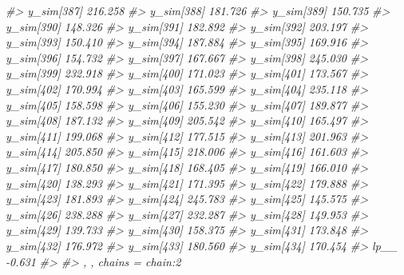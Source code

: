 \documentclass[
  10pt,
  italian,
  a4paper,
  extrafontsizes,onecolumn,openright
  ]{memoir}
\newenvironment{Shaded}{\begin{snugshade}}{\end{snugshade}}
\newcommand{\CommentTok}[1]{\textcolor[rgb]{0.56,0.35,0.01}{\textit{#1}}}
\begin{document}
\begin{Shaded}
\begin{Highlighting}[]
\CommentTok{\#\textgreater{}   y\_sim[387] 216.258}
\CommentTok{\#\textgreater{}   y\_sim[388] 181.726}
\CommentTok{\#\textgreater{}   y\_sim[389] 150.735}
\CommentTok{\#\textgreater{}   y\_sim[390] 148.326}
\CommentTok{\#\textgreater{}   y\_sim[391] 182.892}
\CommentTok{\#\textgreater{}   y\_sim[392] 203.197}
\CommentTok{\#\textgreater{}   y\_sim[393] 150.410}
\CommentTok{\#\textgreater{}   y\_sim[394] 187.884}
\CommentTok{\#\textgreater{}   y\_sim[395] 169.916}
\CommentTok{\#\textgreater{}   y\_sim[396] 154.732}
\CommentTok{\#\textgreater{}   y\_sim[397] 167.667}
\CommentTok{\#\textgreater{}   y\_sim[398] 245.030}
\CommentTok{\#\textgreater{}   y\_sim[399] 232.918}
\CommentTok{\#\textgreater{}   y\_sim[400] 171.023}
\CommentTok{\#\textgreater{}   y\_sim[401] 173.567}
\CommentTok{\#\textgreater{}   y\_sim[402] 170.994}
\CommentTok{\#\textgreater{}   y\_sim[403] 165.599}
\CommentTok{\#\textgreater{}   y\_sim[404] 235.118}
\CommentTok{\#\textgreater{}   y\_sim[405] 158.598}
\CommentTok{\#\textgreater{}   y\_sim[406] 155.230}
\CommentTok{\#\textgreater{}   y\_sim[407] 189.877}
\CommentTok{\#\textgreater{}   y\_sim[408] 187.132}
\CommentTok{\#\textgreater{}   y\_sim[409] 205.542}
\CommentTok{\#\textgreater{}   y\_sim[410] 165.497}
\CommentTok{\#\textgreater{}   y\_sim[411] 199.068}
\CommentTok{\#\textgreater{}   y\_sim[412] 177.515}
\CommentTok{\#\textgreater{}   y\_sim[413] 201.963}
\CommentTok{\#\textgreater{}   y\_sim[414] 205.850}
\CommentTok{\#\textgreater{}   y\_sim[415] 218.006}
\CommentTok{\#\textgreater{}   y\_sim[416] 161.603}
\CommentTok{\#\textgreater{}   y\_sim[417] 180.850}
\CommentTok{\#\textgreater{}   y\_sim[418] 168.405}
\CommentTok{\#\textgreater{}   y\_sim[419] 166.010}
\CommentTok{\#\textgreater{}   y\_sim[420] 138.293}
\CommentTok{\#\textgreater{}   y\_sim[421] 171.395}
\CommentTok{\#\textgreater{}   y\_sim[422] 179.888}
\CommentTok{\#\textgreater{}   y\_sim[423] 181.893}
\CommentTok{\#\textgreater{}   y\_sim[424] 245.783}
\CommentTok{\#\textgreater{}   y\_sim[425] 145.575}
\CommentTok{\#\textgreater{}   y\_sim[426] 238.288}
\CommentTok{\#\textgreater{}   y\_sim[427] 232.287}
\CommentTok{\#\textgreater{}   y\_sim[428] 149.953}
\CommentTok{\#\textgreater{}   y\_sim[429] 139.733}
\CommentTok{\#\textgreater{}   y\_sim[430] 158.375}
\CommentTok{\#\textgreater{}   y\_sim[431] 173.848}
\CommentTok{\#\textgreater{}   y\_sim[432] 176.972}
\CommentTok{\#\textgreater{}   y\_sim[433] 180.560}
\CommentTok{\#\textgreater{}   y\_sim[434] 170.454}
\CommentTok{\#\textgreater{}   lp\_\_        {-}0.631}
\CommentTok{\#\textgreater{} }
\CommentTok{\#\textgreater{} , , chains = chain:2}

\end{Highlighting}
\end{Shaded}
\end{document}
